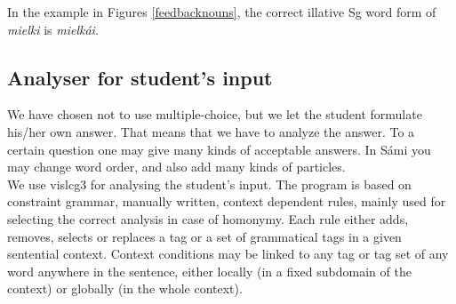 \documentclass[11pt]{article}
\begin{document}
In the example in Figures \ref{feedbacknouns}, the correct illative Sg word form of \textit{mielki} is \textit{mielkái}. %


\subsection{Analyser for student's input} \label{sentencefeedback}
We have chosen not to use multiple-choice, but we let the student formulate his/her own answer. That means that we have to analyze the answer. To a certain question one may give many kinds of acceptable answers. In Sámi you may change word order, and also add many kinds of particles. \\

%
%
%

We use vislcg3 for analysing the student's input. The program is based on constraint grammar, manually written, context dependent rules, mainly used for selecting the correct analysis in case of homonymy. Each rule either adds, removes, selects or replaces a tag or a set of grammatical tags in a given sentential context. Context conditions may be linked to any tag or tag set of any word anywhere in the sentence, either locally (in a fixed subdomain of the context) or globally (in the whole context). 
\end{document}
